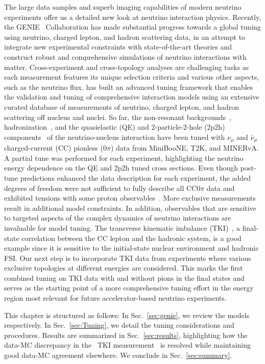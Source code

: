 The large data samples and superb imaging capabilities of modern neutrino experiments offer us a detailed new look at neutrino interaction physics. 
Recently, the GENIE~\cite{Andreopoulos:2009rq, GENIE:2021npt} Collaboration has made substantial progress towards a global tuning using neutrino, charged lepton, and hadron scattering data, in an attempt to integrate new experimental constraints with state-of-the-art theories and construct robust and comprehensive simulations of neutrino interactions with matter. 
Cross-experiment and cross-topology analyses are challenging tasks as each measurement features its unique selection criteria and various other aspects, such as the neutrino flux. 
\genie has built an advanced tuning framework that enables the validation and tuning of comprehensive interaction models using an extensive curated database of measurements of neutrino, charged lepton, and hadron scattering off nucleus and nuclei. 
So far, the non-resonant backgrounds~\cite{GENIE:2021zuu}, hadronization~\cite{GENIE:2021wox}, and the quasielastic (QE) and 2-particle-2-hole (2p2h) components~\cite{GENIE:2022qrc} of the neutrino-nucleus interaction have been tuned with $\nu_\mu$ and $\bar{\nu}_\mu$ charged-current (CC) pionless (0$\pi$) data from MiniBooNE, T2K, and MINERvA. 
A partial tune was performed for each experiment, highlighting the neutrino energy dependence on the QE and 2p2h tuned cross sections. 
Even though post-tune predictions enhanced the data description for each experiment, the added degrees of freedom were not sufficient to fully describe all CC0$\pi$ data and exhibited tensions with some proton observables~\cite{GENIE:2022qrc}. 
More exclusive measurements result in additional model constraints. 
In addition, observables that are sensitive to targeted aspects of the complex dynamics of neutrino interactions are invaluable for model tuning. 
The transverse kinematic imbalance (TKI)~\cite{Lu:2015hea, Lu:2015tcr}, a final-state correlation between the CC lepton and the hadronic system, is a good example since it is sensitive to the initial-state nuclear environment and hadronic FSI. 
Our next step is to incorporate TKI data from experiments where various exclusive topologies at different energies are considered. 
This marks the first combined tuning on TKI data with and without pions in the final states and serves as the starting point of a more comprehensive tuning effort in the energy region most relevant for future accelerator-based neutrino experiments.  

This chapter is structured as follows: 
In Sec.~\ref{sec:genie}, we review the \genie models respectively. 
In Sec.~\ref{sec:Tuning}, we detail the tuning considerations and procedures. 
Results are summarized in Sec.~\ref{sec:results}, highlighting how the data-MC discrepancy in the \minpiz\ TKI measurement~\cite{MINERvA:2020anu} is resolved while maintaining good data-MC agreement elsewhere. 
We conclude in Sec.~\ref{sec:summary}. 

